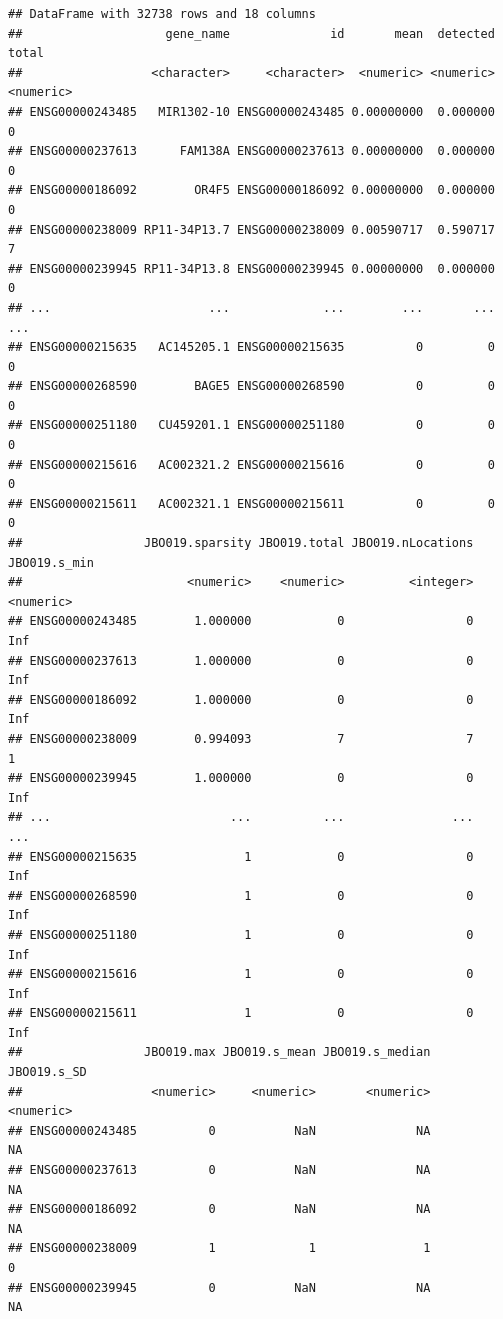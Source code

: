 \documentclass[
]{book}
\begin{document}
\begin{verbatim}
## DataFrame with 32738 rows and 18 columns
##                    gene_name              id       mean  detected     total
##                  <character>     <character>  <numeric> <numeric> <numeric>
## ENSG00000243485   MIR1302-10 ENSG00000243485 0.00000000  0.000000         0
## ENSG00000237613      FAM138A ENSG00000237613 0.00000000  0.000000         0
## ENSG00000186092        OR4F5 ENSG00000186092 0.00000000  0.000000         0
## ENSG00000238009 RP11-34P13.7 ENSG00000238009 0.00590717  0.590717         7
## ENSG00000239945 RP11-34P13.8 ENSG00000239945 0.00000000  0.000000         0
## ...                      ...             ...        ...       ...       ...
## ENSG00000215635   AC145205.1 ENSG00000215635          0         0         0
## ENSG00000268590        BAGE5 ENSG00000268590          0         0         0
## ENSG00000251180   CU459201.1 ENSG00000251180          0         0         0
## ENSG00000215616   AC002321.2 ENSG00000215616          0         0         0
## ENSG00000215611   AC002321.1 ENSG00000215611          0         0         0
##                 JBO019.sparsity JBO019.total JBO019.nLocations JBO019.s_min
##                       <numeric>    <numeric>         <integer>    <numeric>
## ENSG00000243485        1.000000            0                 0          Inf
## ENSG00000237613        1.000000            0                 0          Inf
## ENSG00000186092        1.000000            0                 0          Inf
## ENSG00000238009        0.994093            7                 7            1
## ENSG00000239945        1.000000            0                 0          Inf
## ...                         ...          ...               ...          ...
## ENSG00000215635               1            0                 0          Inf
## ENSG00000268590               1            0                 0          Inf
## ENSG00000251180               1            0                 0          Inf
## ENSG00000215616               1            0                 0          Inf
## ENSG00000215611               1            0                 0          Inf
##                 JBO019.max JBO019.s_mean JBO019.s_median JBO019.s_SD
##                  <numeric>     <numeric>       <numeric>   <numeric>
## ENSG00000243485          0           NaN              NA          NA
## ENSG00000237613          0           NaN              NA          NA
## ENSG00000186092          0           NaN              NA          NA
## ENSG00000238009          1             1               1           0
## ENSG00000239945          0           NaN              NA          NA

\end{verbatim}
\end{document}
